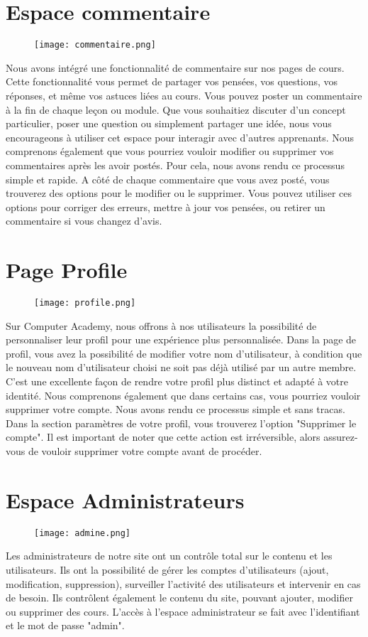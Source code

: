 \documentclass{article}
\begin{document}
\section{Espace commentaire}
\begin{figure}[h]
\centering
\texttt{[image: commentaire.png]} 
\end{figure}
Nous avons intégré une fonctionnalité de commentaire sur nos pages de cours. Cette fonctionnalité vous permet de partager vos pensées, vos questions, vos réponses, et même vos astuces liées au cours.
Vous pouvez poster un commentaire à la fin de chaque leçon ou module. Que vous souhaitiez discuter d'un concept particulier, poser une question ou simplement partager une idée, nous vous encourageons à utiliser cet espace pour interagir avec d'autres apprenants.
Nous comprenons également que vous pourriez vouloir modifier ou supprimer vos commentaires après les avoir postés. Pour cela, nous avons rendu ce processus simple et rapide. A côté de chaque commentaire que vous avez posté, vous trouverez des options pour le modifier ou le supprimer. Vous pouvez utiliser ces options pour corriger des erreurs, mettre à jour vos pensées, ou retirer un commentaire si vous changez d'avis.
\newpage
\section{Page Profile}

\begin{figure}[h]
\centering
\texttt{[image: profile.png]} 
\end{figure}
Sur Computer Academy, nous offrons à nos utilisateurs la possibilité de personnaliser leur profil pour une expérience plus personnalisée. Dans la page de profil, vous avez la possibilité de modifier votre nom d'utilisateur, à condition que le nouveau nom d'utilisateur choisi ne soit pas déjà utilisé par un autre membre. C'est une excellente façon de rendre votre profil plus distinct et adapté à votre identité.
Nous comprenons également que dans certains cas, vous pourriez vouloir supprimer votre compte. Nous avons rendu ce processus simple et sans tracas. Dans la section paramètres de votre profil, vous trouverez l'option "Supprimer le compte". Il est important de noter que cette action est irréversible, alors assurez-vous de vouloir supprimer votre compte avant de procéder.
\section{Espace Administrateurs}
\begin{figure}[h]
\centering
\texttt{[image: admine.png]} 
\end{figure}
Les administrateurs de notre site ont un contrôle total sur le contenu et les utilisateurs. Ils ont la possibilité de gérer les comptes d'utilisateurs (ajout, modification, suppression), surveiller l'activité des utilisateurs et intervenir en cas de besoin. Ils contrôlent également le contenu du site, pouvant ajouter, modifier ou supprimer des cours. L'accès à l'espace administrateur se fait avec l'identifiant et le mot de passe "admin".
\end{document}
